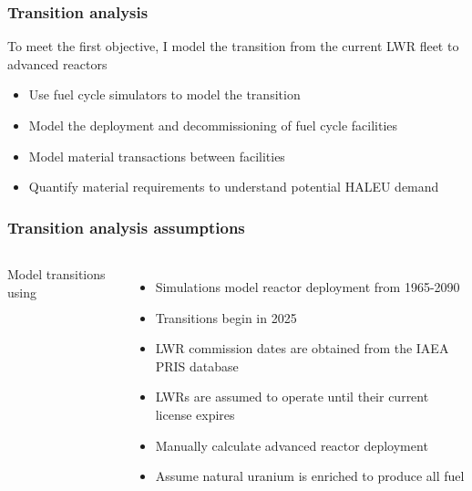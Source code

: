 \begin{frame}
    \frametitle{Transition analysis}
    To meet the first objective, I model the transition from the current 
    \gls{LWR} fleet to advanced reactors
    \begin{itemize}
        \item Use fuel cycle simulators to model the transition
        \item Model the deployment and decommissioning of fuel cycle facilities 
        \item Model material transactions between facilities
        \item Quantify material requirements to understand potential \gls{HALEU}
              demand
    \end{itemize}

\end{frame}

\begin{frame}
    \frametitle{Transition analysis assumptions}
    \begin{columns}
        
    \column[t]{6cm}
    \vspace{-0.9cm}
    

        \column[t]{4.5cm}
        Model transitions using \Cyclus \cite{huff_fundamental_2016}
        \begin{itemize}
            \item Simulations model reactor deployment from 1965-2090
            \item Transitions begin in 2025
            \item<2-> \gls{LWR} commission dates are obtained from the IAEA PRIS
                database \cite{noauthor_power_1989}
            \item<2-> \glspl{LWR} are assumed to operate until their current license 
                expires
            \item<3-> Manually calculate advanced reactor deployment
            \item<3-> Assume natural uranium is enriched to produce all 
                  fuel
        \end{itemize}

\end{columns}
\end{frame}

